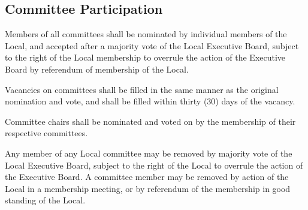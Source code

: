 \documentclass[11pt]{article}
\newcommand{\articlesection}[1]{\vspace{.25cm}\subsection{#1}}
\begin{document}
\articlesection{Committee Participation}
Members of all committees shall be nominated by individual members of the Local, and accepted after a majority vote of the Local Executive Board, subject to the right of the Local membership to overrule the action of the Executive Board by referendum of membership of the Local.

Vacancies on committees shall be filled in the same manner as the original nomination and vote, and shall be filled within thirty (30) days of the vacancy.

Committee chairs shall be nominated and voted on by the membership of their respective committees.

Any member of any Local committee may be removed by majority vote of the Local Executive Board, subject to the right of the Local to overrule the action of the Executive Board. A committee member may be removed by action of the Local in a membership meeting, or by referendum of the membership in good standing of the Local.
\end{document}
